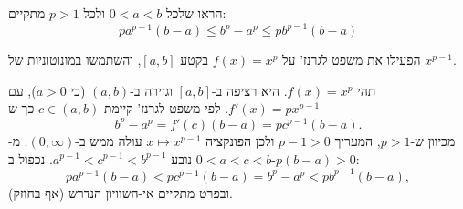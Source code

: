 
\begin{question}
הראו שלכל $0<a<b$ ולכל $p>1$ מתקיים:
\[ pa^{p-1}(b-a)\le b^p-a^p\le pb^{p-1}(b-a) \]
\end{question}

\begin{hint}
הפעילו את משפט לגרנז' על $f(x)=x^p$ בקטע $[a,b]$, והשתמשו במונוטוניות של $x^{p-1}$.
\end{hint}

\begin{solution}
תהי $f(x)=x^p$. היא רציפה ב-$[a,b]$ וגזירה ב-$(a,b)$ (כי $a>0$), עם $f'(x)=px^{p-1}$. לפי משפט לגרנז' קיימת $c\in(a,b)$ כך ש-
\[ b^p-a^p=f'(c)(b-a)=pc^{p-1}(b-a). \]
מכיוון ש-$p>1$, המעריך $p-1>0$ ולכן הפונקציה $x\mapsto x^{p-1}$ עולה ממש ב-$(0,\infty)$. מ-$0<a<c<b$ נובע $a^{p-1}<c^{p-1}<b^{p-1}$. נכפול ב-$p(b-a)>0$:
\[ pa^{p-1}(b-a)<pc^{p-1}(b-a)=b^p-a^p<pb^{p-1}(b-a), \]
ובפרט מתקיים אי-השוויון הנדרש (אף בחוזק).
\end{solution}
